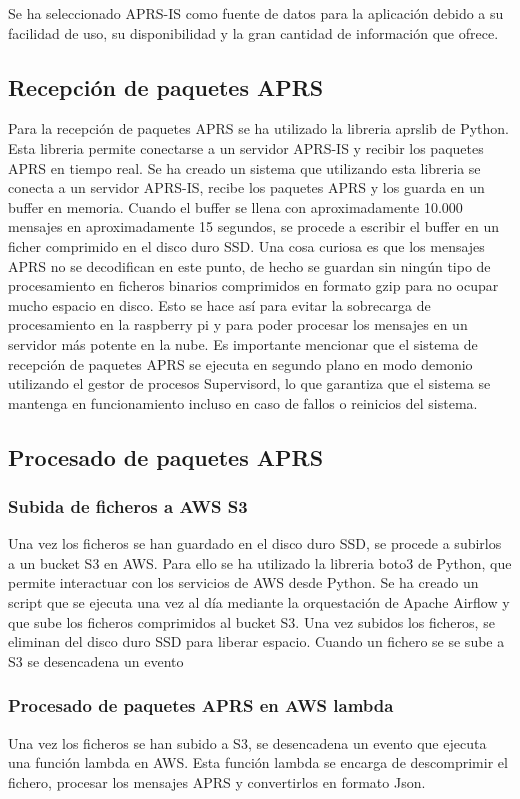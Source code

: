 Se ha seleccionado APRS-IS como fuente de datos para la aplicación debido a su facilidad de uso, su disponibilidad y la gran cantidad de información que ofrece.

\subsection{Recepción de paquetes APRS}
Para la recepción de paquetes APRS se ha utilizado la libreria aprslib de Python. Esta libreria permite conectarse a un servidor APRS-IS y recibir los paquetes APRS en tiempo real. Se ha creado un sistema que utilizando esta libreria se conecta a un servidor APRS-IS, recibe los paquetes APRS y los guarda en un buffer en memoria. Cuando el buffer se llena con aproximadamente 10.000 mensajes en aproximadamente 15 segundos, se procede a escribir el buffer en un ficher comprimido en el disco duro SSD.
Una cosa curiosa es que los mensajes APRS no se decodifican en este punto, de hecho se guardan sin ningún tipo de procesamiento en ficheros binarios comprimidos en formato gzip para no ocupar mucho espacio en disco. Esto se hace así para evitar la sobrecarga de procesamiento en la raspberry pi y para poder procesar los mensajes en un servidor más potente en la nube.
Es importante mencionar que el sistema de recepción de paquetes APRS se ejecuta en segundo plano en modo demonio utilizando el gestor de procesos Supervisord, lo que garantiza que el sistema se mantenga en funcionamiento incluso en caso de fallos o reinicios del sistema.

\subsection{Procesado de paquetes APRS}
\subsubsection{Subida de ficheros a AWS S3}
Una vez los ficheros se han guardado en el disco duro SSD, se procede a subirlos a un bucket S3 en AWS. Para ello se ha utilizado la libreria boto3 de Python, que permite interactuar con los servicios de AWS desde Python. Se ha creado un script que se ejecuta una vez al día mediante la orquestación de Apache Airflow y que sube los ficheros comprimidos al bucket S3. Una vez subidos los ficheros, se eliminan del disco duro SSD para liberar espacio. Cuando un fichero se se sube a S3 se desencadena un evento 
\subsubsection{Procesado de paquetes APRS en AWS lambda}
Una vez los ficheros se han subido a S3, se desencadena un evento que ejecuta una función lambda en AWS. Esta función lambda se encarga de descomprimir el fichero, procesar los mensajes APRS y convertirlos en formato Json. 


